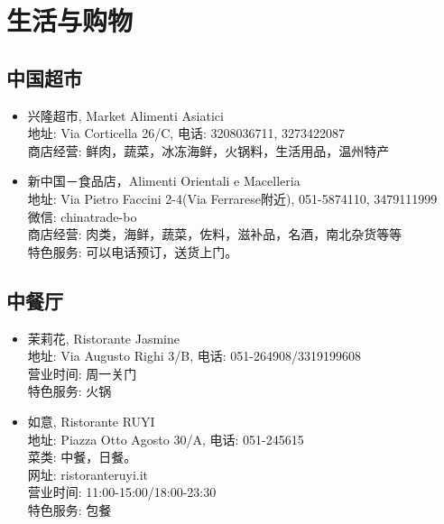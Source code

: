 \chapter{生活与购物}              



\section{中国超市}

\begin{multicols}{2}

\begin{itemize}
\item 兴隆超市, Market Alimenti Asiatici\\
地址: Via Corticella 26/C, 电话: 3208036711, 3273422087\\
商店经营: 鲜肉，蔬菜，冰冻海鲜，火锅料，生活用品，温州特产

\item 新中国－食品店，Alimenti Orientali e Macelleria\\
地址: Via Pietro Faccini 2-4(Via Ferrarese附近), 051-5874110, 3479111999\\
微信: chinatrade-bo\\
商店经营: 肉类，海鲜，蔬菜，佐料，滋补品，名酒，南北杂货等等\\
特色服务: 可以电话预订，送货上门。
\end{itemize}



\section{中餐厅}
\begin{itemize}
\item 茉莉花, Ristorante Jasmine\\
地址: Via Augusto Righi 3/B, 电话: 051-264908/3319199608 \\
营业时间: 周一关门\\
特色服务: 火锅

\item 如意, Ristorante RUYI\\
地址: Piazza Otto Agosto 30/A, 电话: 051-245615\\
菜类: 中餐，日餐。\\
网址: ristoranteruyi.it \\
营业时间: 11:00-15:00/18:00-23:30\\
特色服务: 包餐
\end{itemize}



\end{multicols}

